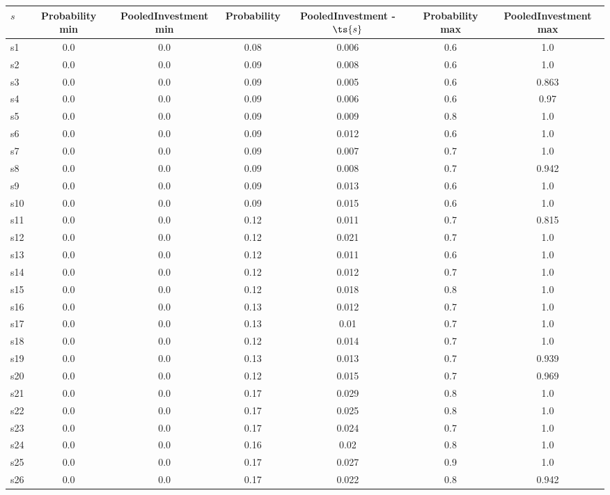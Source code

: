 \documentclass{article}
\begin{document}
\noindent\begin{tabular}{|l|c|c|c|c|c|c|}
\hline
$s$& Probability min & PooledInvestment min & Probability & PooledInvestment - $\ts{s}$ & Probability max & PooledInvestment max\\
\hline
s1 &0.0 & 0.0 & 0.08 & 0.006 & 0.6 & 1.0\\
\hline
s2 &0.0 & 0.0 & 0.09 & 0.008 & 0.6 & 1.0\\
\hline
s3 &0.0 & 0.0 & 0.09 & 0.005 & 0.6 & 0.863\\
\hline
s4 &0.0 & 0.0 & 0.09 & 0.006 & 0.6 & 0.97\\
\hline
s5 &0.0 & 0.0 & 0.09 & 0.009 & 0.8 & 1.0\\
\hline
s6 &0.0 & 0.0 & 0.09 & 0.012 & 0.6 & 1.0\\
\hline
s7 &0.0 & 0.0 & 0.09 & 0.007 & 0.7 & 1.0\\
\hline
s8 &0.0 & 0.0 & 0.09 & 0.008 & 0.7 & 0.942\\
\hline
s9 &0.0 & 0.0 & 0.09 & 0.013 & 0.6 & 1.0\\
\hline
s10 &0.0 & 0.0 & 0.09 & 0.015 & 0.6 & 1.0\\
\hline
s11 &0.0 & 0.0 & 0.12 & 0.011 & 0.7 & 0.815\\
\hline
s12 &0.0 & 0.0 & 0.12 & 0.021 & 0.7 & 1.0\\
\hline
s13 &0.0 & 0.0 & 0.12 & 0.011 & 0.6 & 1.0\\
\hline
s14 &0.0 & 0.0 & 0.12 & 0.012 & 0.7 & 1.0\\
\hline
s15 &0.0 & 0.0 & 0.12 & 0.018 & 0.8 & 1.0\\
\hline
s16 &0.0 & 0.0 & 0.13 & 0.012 & 0.7 & 1.0\\
\hline
s17 &0.0 & 0.0 & 0.13 & 0.01 & 0.7 & 1.0\\
\hline
s18 &0.0 & 0.0 & 0.12 & 0.014 & 0.7 & 1.0\\
\hline
s19 &0.0 & 0.0 & 0.13 & 0.013 & 0.7 & 0.939\\
\hline
s20 &0.0 & 0.0 & 0.12 & 0.015 & 0.7 & 0.969\\
\hline
s21 &0.0 & 0.0 & 0.17 & 0.029 & 0.8 & 1.0\\
\hline
s22 &0.0 & 0.0 & 0.17 & 0.025 & 0.8 & 1.0\\
\hline
s23 &0.0 & 0.0 & 0.17 & 0.024 & 0.7 & 1.0\\
\hline
s24 &0.0 & 0.0 & 0.16 & 0.02 & 0.8 & 1.0\\
\hline
s25 &0.0 & 0.0 & 0.17 & 0.027 & 0.9 & 1.0\\
\hline
s26 &0.0 & 0.0 & 0.17 & 0.022 & 0.8 & 0.942\\

\end{tabular}
\end{document}
